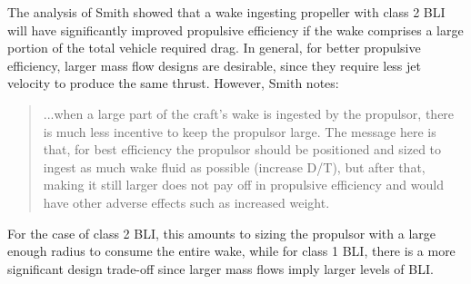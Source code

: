				The analysis of Smith \cite{Smith1993} showed that a wake ingesting propeller with class 2 BLI will have significantly improved propulsive efficiency if the wake comprises a large portion of the total vehicle required drag.  In general, for better propulsive efficiency, larger mass flow designs are desirable, since they require less jet velocity to produce the same thrust. However, Smith notes:
				\begin{quotation}
					...when a large part of the craft's wake is ingested by the
					propulsor, there is much less incentive to keep the propulsor
					large. The message here is that, for best efficiency the propulsor
					should be positioned and sized to ingest as much wake
					fluid as possible (increase D/T), but after that, making it still
					larger does not pay off in propulsive efficiency and would
					have other adverse effects such as increased weight.
				\end{quotation}
				For the case of class 2 BLI, this amounts to sizing the propulsor with a large enough radius to consume the entire wake, while for class 1 BLI, there is a more significant design trade-off since larger mass flows imply larger levels of BLI.  
				
				
